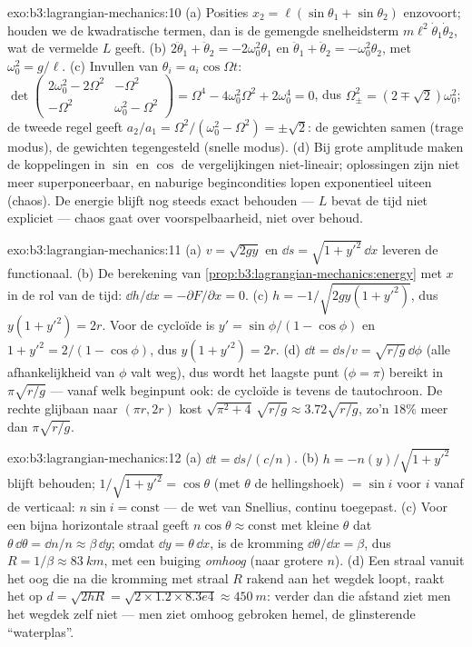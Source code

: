 \begin{solution}{exo:b3:lagrangian-mechanics:10}
(a) Posities $x_2 = \ell(\sin\theta_1 + \sin\theta_2)$ enzovoort; houden
we de kwadratische termen, dan is de gemengde snelheidsterm
$m\ell^2\dot\theta_1\dot\theta_2$, wat de vermelde $L$ geeft. (b)
$2\ddot\theta_1 + \ddot\theta_2 = -2\omega_0^2\theta_1$ en
$\ddot\theta_1 + \ddot\theta_2 = -\omega_0^2\theta_2$, met $\omega_0^2
= g/\ell$. (c) Invullen van $\theta_i = a_i\cos\Omega t$:
$\det\begin{pmatrix} 2\omega_0^2 - 2\Omega^2 & -\Omega^2\\ -\Omega^2 &
\omega_0^2 - \Omega^2\end{pmatrix} = \Omega^4 - 4\omega_0^2\Omega^2 +
2\omega_0^4 = 0$, dus $\Omega_\pm^2 = (2 \mp \sqrt2)\omega_0^2$; de
tweede regel geeft $a_2/a_1 = \Omega^2/(\omega_0^2 - \Omega^2) =
\pm\sqrt2$: de gewichten samen (trage modus), de gewichten tegengesteld
(snelle modus). (d) Bij grote amplitude maken de koppelingen in $\sin$
en $\cos$ de vergelijkingen niet-lineair; oplossingen zijn niet meer
superponeerbaar, en naburige begincondities lopen exponentieel uiteen
(chaos). De energie blijft nog steeds exact behouden --- $L$ bevat de
tijd niet expliciet --- chaos gaat over voorspelbaarheid, niet over
behoud.
\end{solution}

\begin{solution}{exo:b3:lagrangian-mechanics:11}
(a) $v = \sqrt{2gy}$ en $\dd s = \sqrt{1 + y'^2}\,\dd x$ leveren de
functionaal. (b) De berekening van
\cref{prop:b3:lagrangian-mechanics:energy} met $x$ in de rol van de
tijd: $\dd
h/\dd x = -\partial F/\partial x = 0$. (c) $h = -1/\sqrt{2gy(1 +
y'^2)}$, dus $y(1 + y'^2) = 2r$. Voor de cycloïde is $y' =
\sin\phi/(1 - \cos\phi)$ en $1 + y'^2 = 2/(1 - \cos\phi)$, dus
$y(1 + y'^2) = 2r$. (d) $\dd t = \dd s/v = \sqrt{r/g}\,\dd\phi$ (alle
afhankelijkheid van $\phi$ valt weg), dus wordt het laagste punt ($\phi = \pi$) bereikt in $\pi\sqrt{r/g}$ --- vanaf welk beginpunt ook: de
cycloïde is tevens de tautochroon. De rechte glijbaan naar $(\pi r, 2r)$
kost $\sqrt{\pi^2
+ 4}\,\sqrt{r/g} \approx 3.72\sqrt{r/g}$, zo'n $18\%$
meer dan $\pi\sqrt{r/g}$.
\end{solution}

\begin{solution}{exo:b3:lagrangian-mechanics:12}
(a) $\dd t = \dd s/(c/n)$. (b) $h = -n(y)/\sqrt{1 + y'^2}$ blijft
behouden; $1/\sqrt{1 + y'^2} = \cos\theta$ (met $\theta$ de hellingshoek)
$= \sin i$ voor $i$ vanaf de verticaal: $n\sin i = \text{const}$ --- de
wet van Snellius, continu toegepast. (c) Voor een bijna horizontale
straal geeft $n\cos\theta \approx \text{const}$ met kleine $\theta$ dat
$\theta\,\dd\theta = \dd n/n \approx \beta\,\dd y$; omdat $\dd y =
\theta\,\dd x$, is de kromming $\dd\theta/\dd x = \beta$, dus $R =
1/\beta \approx \qty{83}{km}$, met een buiging \emph{omhoog} (naar
grotere $n$). (d) Een straal vanuit het oog die na die kromming met
straal $R$ rakend aan het wegdek loopt, raakt het op $d = \sqrt{2hR} = \sqrt{2 \times 1.2 \times
8.3e4} \approx \qty{450}{m}$: verder dan die
afstand ziet men het wegdek zelf niet --- men ziet omhoog gebroken
hemel, de glinsterende ``waterplas''.
\end{solution}

